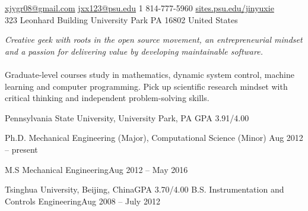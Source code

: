 \documentclass[10pt,a4paper]{article}
\begin{document}
\sloppy  %



\nobreakvspace{0.3em}  %

\noindent\href{mailto:xjygr08@gmail.com}{xjygr08@gmail.com}\sbull
\href{mailto:jxx123@psu.edu}{jxx123@psu.edu}\sbull
\textsmaller{+}1 814-777-5960\sbull
\href{http://sites.psu.edu/jinyuxie/}{sites.psu.edu/jinyuxie}
\\
323 Leonhard Building\sbull
University Park\sbull
PA 16802\sbull
United States

\spacedhrule{0.9em}{-0.4em}  %


\vspace{-1.3em}  %
\begin{multicols}{2}  %
\noindent \emph{Creative geek with roots in the open source movement, an entrepreneurial mindset and a passion for delivering value by developing maintainable software.}
\\
\\
Graduate-level courses study in mathematics, dynamic system control, machine
learning and computer programming. Pick up scientific research mindset with
critical thinking and independent problem-solving skills.
\end{multicols}


\spacedhrule{0em}{-0.4em}


\headedsection
{Pennsylvania State University, University Park, PA}
{GPA 3.91/4.00}{
  \headedsubsection
  {Ph.D. Mechanical Engineering (Major), Computational Science (Minor)}
  {Aug 2012 -- present}{}

  \headedsubsection
  {M.S Mechanical Engineering}{Aug 2012 -- May 2016}{}
}

\headedsection
{Tsinghua University, Beijing, China}{GPA 3.70/4.00}{
	\headedsubsection
  {B.S. Instrumentation and Controls Engineering}{Aug 2008 -- July 2012}{}
}
\end{document}
